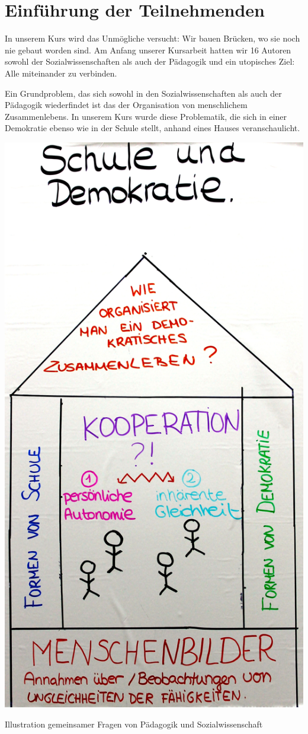 \section[Einführung]{Einführung der Teilnehmenden}

In unserem Kurs wird das Unmögliche versucht:
Wir bauen Brücken, wo sie noch nie gebaut worden sind.
Am Anfang unserer Kursarbeit hatten wir 16 Autoren sowohl der Sozialwissenschaften als auch der Pädagogik und ein utopisches Ziel:
Alle miteinander zu verbinden.

Ein Grundproblem, das sich sowohl in den Sozialwissenschaften als auch der Pädagogik wiederfindet ist das der Organisation von menschlichem Zusammenlebens.
In unserem Kurs wurde diese Problematik, die sich in einer Demokratie ebenso wie in der Schule stellt, anhand eines Hauses veranschaulicht.

\begin{dsafigure}
	\begin{center}
	\includegraphics[width=0.9\columnwidth]{img/Kooperationshaus.JPG}
	\caption{Illustration gemeinsamer Fragen von Pädagogik und Sozialwissenschaft}
	\label{fig:kooperationshaus}
	\end{center}
\end{dsafigure}

